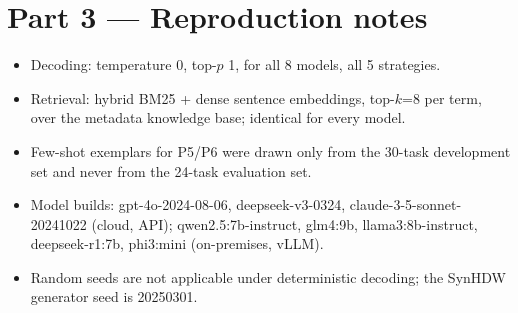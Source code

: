 \documentclass[10pt]{article}
\begin{document}
\section{Part 3 --- Reproduction notes}
\begin{itemize}[leftmargin=1.4em,itemsep=1pt,topsep=2pt]
  \item Decoding: temperature 0, top-$p$ 1, for all 8 models, all 5 strategies.
  \item Retrieval: hybrid BM25 + dense sentence embeddings, top-$k$=8 per term,
        over the metadata knowledge base; identical for every model.
  \item Few-shot exemplars for P5/P6 were drawn only from the 30-task
        development set and never from the 24-task evaluation set.
  \item Model builds: gpt-4o-2024-08-06, deepseek-v3-0324,
        claude-3-5-sonnet-20241022 (cloud, API); qwen2.5:7b-instruct, glm4:9b,
        llama3:8b-instruct, deepseek-r1:7b, phi3:mini (on-premises, vLLM).
  \item Random seeds are not applicable under deterministic decoding; the
        SynHDW generator seed is 20250301.
\end{itemize}
\end{document}
